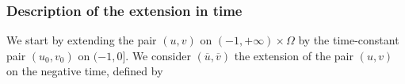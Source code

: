 \documentclass[reqno,12pt,twoside]{amsart}
\newtheorem{theorem}{Theorem}[section]
\numberwithin{equation}{section} \numberwithin{theorem}{section}
\numberwithin{proposition}{section} \numberwithin{lemma}{section}
\numberwithin{corollary}{section}
\numberwithin{definition}{section} \numberwithin{remark}{section}
\begin{document}
%
%
%

\subsubsection{Description of the extension in time}

We start by extending the pair $(u,v)$ on $(-1,+\infty) \times \Omega$ by the time-constant pair $(u_0,v_0)$ on $(-1,0]$. We consider $(\overline{u}, \overline{v})$ the extension of the pair $(u,v)$ on the negative time, defined by
\end{document}
